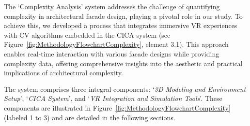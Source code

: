 
The `Complexity Analysis' system addresses the challenge of quantifying complexity in architectural facade design, playing a pivotal role in our study.
To achieve this, we developed a process that integrates immersive VR experiences with CV algorithms embedded in the CICA system (see Figure~\ref{fig:MethodologyFlowchartComplexity}, element 3.1).
This approach enables real-time interaction with various facade designs while providing complexity data, offering comprehensive insights into the aesthetic and practical implications of architectural complexity.

The system comprises three integral components: `\textit{3D Modeling and Environment Setup}', `\textit{CICA System}', and `\textit{VR Integration and Simulation Tools}'.
These components are illustrated in Figure~\ref{fig:MethodologyFlowchartComplexity} (labeled 1 to 3) and are detailed in the following sections.
